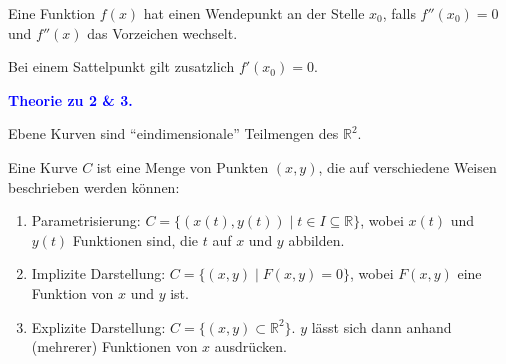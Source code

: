 \documentclass[12pt]{article}
\newcommand{\R}{\mathbb{R}} %
\newenvironment{definition}[2][Definition]{\begin{trivlist}
        \item[\hskip \labelsep {\bfseries #1}\hskip \labelsep {\bfseries #2.}]}{\flushright{$\square$}\end{trivlist}}
\newenvironment{remark}[2][Bemerkung]{\begin{trivlist}
        \item[\hskip \labelsep {\bfseries #1}\hskip \labelsep {\bfseries #2.}]}{\end{trivlist}}
\begin{document}
\begin{definition}{[Wendepunkte]}
        Eine Funktion $f(x)$ hat einen Wendepunkt an der Stelle $x_0$, falls $f''(x_0)=0$ und $f''(x)$ das Vorzeichen wechselt.

        \begin{remark}{[Wendepunkte und Sattelpunkte]}
                Bei einem Sattelpunkt gilt zusatzlich $f'(x_0)=0$.
        \end{remark}
\end{definition}

\textbf{\textcolor{blue}{Theorie zu 2 \& 3.}}

\begin{definition}{[Ebene Kurven]}
        Ebene Kurven sind ``eindimensionale'' Teilmengen des $\R^2$.

        Eine Kurve $C$ ist eine Menge von Punkten $(x,y)$, die auf verschiedene Weisen
        beschrieben werden können:
        \begin{enumerate}
                \item Parametrisierung: $C=\{(x(t),y(t))\mid t\in I\subseteq\R\}$, wobei $x(t)$ und
                      $y(t)$ Funktionen sind, die $t$ auf $x$ und $y$ abbilden.
                \item Implizite Darstellung: $C=\{(x,y)\mid F(x,y)=0\}$, wobei $F(x,y)$ eine Funktion
                      von $x$ und $y$ ist.
                \item Explizite Darstellung: $C=\{(x,y)\subset\R^2\}$. $y$ lässt sich dann anhand
                      (mehrerer) Funktionen von $x$ ausdrücken.


\end{enumerate}
\end{definition}
\end{document}
